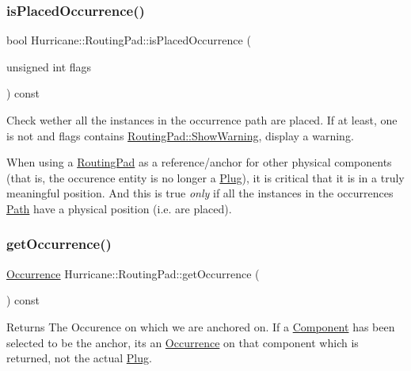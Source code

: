 \subsubsection{\texorpdfstring{is\+Placed\+Occurrence()}{isPlacedOccurrence()}}
{\footnotesize\ttfamily bool Hurricane\+::\+Routing\+Pad\+::is\+Placed\+Occurrence (\begin{DoxyParamCaption}\item[{unsigned int}]{flags }\end{DoxyParamCaption}) const}

Check wether all the instances in the occurrence path are placed. If at least, one is not and {\ttfamily flags} contains \mbox{\hyperlink{classHurricane_1_1RoutingPad_a69f37f0b06b9bfd758d9be42c71e2bd4a8fd74358022a29aab828700c8f7347ba}{Routing\+Pad\+::\+Show\+Warning}}, display a warning.

When using a \mbox{\hyperlink{classHurricane_1_1RoutingPad}{Routing\+Pad}} as a reference/anchor for other physical components (that is, the occurence entity is no longer a \mbox{\hyperlink{classHurricane_1_1Plug}{Plug}}), it is critical that it is in a truly meaningful position. And this is true {\itshape only} if all the instances in the occurrence\textquotesingle{}s \mbox{\hyperlink{classHurricane_1_1Path}{Path}} have a physical position (i.\+e. are placed). \mbox{\label{classHurricane_1_1RoutingPad_a2767550364ef01c772f3270850ec052f}} 
\subsubsection{\texorpdfstring{get\+Occurrence()}{getOccurrence()}}
{\footnotesize\ttfamily \mbox{\hyperlink{classHurricane_1_1Occurrence}{Occurrence}} Hurricane\+::\+Routing\+Pad\+::get\+Occurrence (\begin{DoxyParamCaption}{ }\end{DoxyParamCaption}) const\hspace{0.3cm}{\ttfamily [inline]}}

\begin{DoxyReturn}{Returns}
The Occurence on which we are anchored on. If a \mbox{\hyperlink{classHurricane_1_1Component}{Component}} has been selected to be the anchor, it\textquotesingle{}s an \mbox{\hyperlink{classHurricane_1_1Occurrence}{Occurrence}} on that component which is returned, not the actual \mbox{\hyperlink{classHurricane_1_1Plug}{Plug}}. 
\end{DoxyReturn}
\mbox{\label{classHurricane_1_1RoutingPad_a30190c50577ce47727dec11f5423a85b}} 
